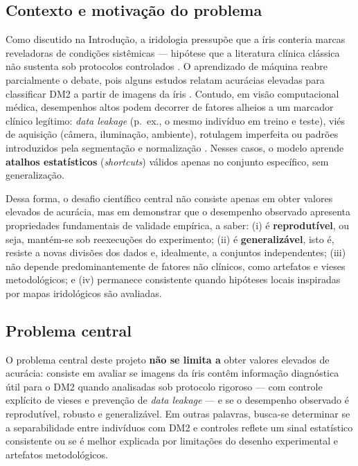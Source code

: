 \documentclass[11pt,a4paper]{article}
\begin{document}
\subsection{Contexto e motivação do problema}
Como discutido na Introdução, a iridologia pressupõe que a íris conteria marcas reveladoras de condições sistêmicas --- hipótese que a literatura clínica clássica não sustenta sob protocolos controlados \citep{Simon1979JAMA, Knipschild1988BMJ, Ernst2000ArchOphthalmol}. O aprendizado de máquina reabre parcialmente o debate, pois alguns estudos relatam acurácias elevadas para classificar DM2 a partir de imagens da íris \citep{SamantAgarwal2018CMPB}. Contudo, em visão computacional médica, desempenhos altos podem decorrer de fatores alheios a um marcador clínico legítimo: \textit{data leakage} (p.\ ex., o mesmo indivíduo em treino e teste), viés de aquisição (câmera, iluminação, ambiente), rotulagem imperfeita ou padrões introduzidos pela segmentação e normalização \citep{Zech2018}. Nesses casos, o modelo aprende \textbf{atalhos estatísticos} (\textit{shortcuts}) válidos apenas no conjunto específico, sem generalização.

Dessa forma, o desafio científico central não consiste apenas em obter valores elevados de acurácia, mas em demonstrar que o desempenho observado apresenta propriedades fundamentais de validade empírica, a saber:
(i) é \textbf{reprodutível}, ou seja, mantém-se sob reexecuções do experimento;
(ii) é \textbf{generalizável}, isto é, resiste a novas divisões dos dados e, idealmente, a conjuntos independentes;
(iii) não depende predominantemente de fatores não clínicos, como artefatos e vieses metodológicos;
e (iv) permanece consistente quando hipóteses locais inspiradas por mapas iridológicos são avaliadas.

\subsection{Problema central}
O problema central deste projeto \textbf{não se limita a} obter valores elevados de acurácia: consiste em avaliar se imagens da íris contêm informação diagnóstica útil para o DM2 quando analisadas sob protocolo rigoroso --- com controle explícito de vieses e prevenção de \textit{data leakage} --- e se o desempenho observado é reprodutível, robusto e generalizável. Em outras palavras, busca-se determinar se a separabilidade entre indivíduos com DM2 e controles reflete um sinal estatístico consistente ou se é melhor explicada por limitações do desenho experimental e artefatos metodológicos.
\end{document}
